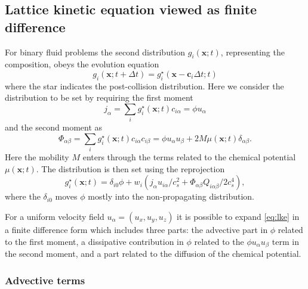 \subsection{Lattice kinetic equation viewed as finite difference}

For binary fluid problems the second distribution $g_i (\mathbf{x};t)$,
representing the composition, obeys the evolution equation
\begin{equation}
g_i (\mathbf{x}; t + \Delta t )
= g_i^\star (\mathbf{x} - \mathbf{c}_i \Delta t; t)
\label{lke}
\end{equation}
where the star indicates the post-collision distribution. Here we consider
the distribution to be set by requiring the first moment
\begin{equation}
j_\alpha = \sum_i g_i^\star (\mathbf{x};t) c_{i\alpha} = \phi u_\alpha
\label{eq:moment1}
\end{equation}
and the second moment as
\begin{equation}
\Phi_{\alpha\beta} = \sum_i g_i^\star (\mathbf{x}; t) c_{i\alpha} c_{i\beta}
= \phi u_\alpha u_\beta + 2M\mu (\mathbf{x};t) \delta_{\alpha\beta}.
\end{equation}
Here the mobility $M$ enters through the terms related to the chemical
potential $\mu (\mathbf{x};t)$. The distribution is then set using the
reprojection
\begin{equation}
g_i^\star (\mathbf{x}; t) = \delta_{i0}\phi
+ w_i (j_\alpha u_{i\alpha} / c_s^2
+      \Phi_{\alpha\beta} Q_{i\alpha\beta} / 2c_s^4),
\end{equation}
where the $\delta_{i0}$ moves $\phi$ mostly into the non-propagating
distribution.

For a uniform velocity field $u_\alpha = (u_x, u_y, u_z)$ it is possible
to expand \ref{eq:lke} in a finite difference form which includes three
parts: the advective part in $\phi$ related to the first moment, a
dissipative contribution in $\phi$ related to the $\phi u_\alpha u_\beta$
term in the second moment, and a part related to the
 diffusion of the chemical potential.

\subsubsection{Advective terms}

